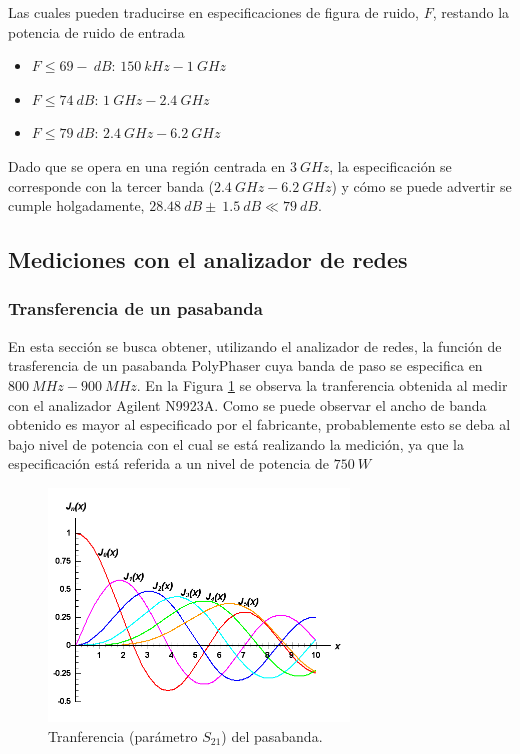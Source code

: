 \documentclass[a4paper,10pt]{article}
\begin{document}
		\indent Las cuales pueden traducirse en especificaciones de figura de 
		ruido, $F$, restando la potencia de ruido de entrada
		
		\begin{itemize}
			\item $F\leq69-~dB$: 	$150~kHz-1~GHz$
			\item $F\leq74~dB$:	 $1~GHz-2.4~GHz$
			\item $F\leq79~dB$:	 $2.4~GHz-6.2~GHz$
		\end{itemize}
		
		\indent Dado que se opera en una regi\'on centrada en $3~GHz$, la 
		especificaci\'on se corresponde con la tercer banda ($2.4~GHz-6.2~GHz$) 
		y c\'omo se puede advertir se cumple holgadamente, 
		$28.48~dB\pm~1.5~dB\ll79~dB$.
		
	\subsection{Mediciones con el analizador de redes}
		\subsubsection{Transferencia de un pasabanda}
		\indent En esta secci\'on se busca obtener, utilizando el analizador de 
		redes, la funci\'on de trasferencia de un pasabanda PolyPhaser cuya 
		banda de paso se especifica en  $800~MHz-900~MHz$. En la Figura 
		\ref{transferenciabandpass} se observa la tranferencia obtenida al 
		medir con el analizador Agilent N9923A. Como se puede observar el ancho 
		de banda obtenido es mayor al especificado por el fabricante, 
		probablemente esto se deba al bajo nivel de potencia con el cual se 
		est\'a realizando la medici\'on, ya que la especificaci\'on est\'a 
		referida a un nivel de potencia de $750~W$
		
		\begin{figure}[!htb]
				\centering
				\includegraphics[width=8cm]
				{Imagenes/bessel.png}
				\caption{Tranferencia (par\'ametro $S_{21}$) del pasabanda.}
				\label{transferenciabandpass} 
		\end{figure}
\end{document}
